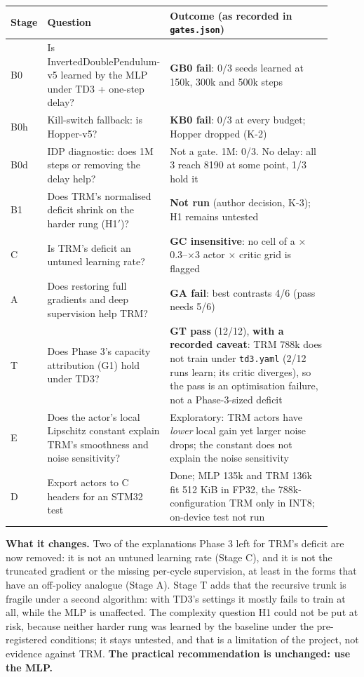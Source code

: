 \documentclass[11pt]{article}
\begin{document}
\begin{center}\small\begin{tabular}{>{\raggedright\arraybackslash}p{0.059\linewidth}>{\raggedright\arraybackslash}p{0.310\linewidth}>{\raggedright\arraybackslash}p{0.538\linewidth}}
\toprule
Stage & Question & Outcome (as recorded in \texttt{gates.json}) \\
\midrule
B0 & Is InvertedDoublePendulum-v5 learned by the MLP under TD3 + one-step delay? & \textbf{GB0 fail}: 0/3 seeds learned at 150k, 300k and 500k steps \\
B0h & Kill-switch fallback: is Hopper-v5? & \textbf{KB0 fail}: 0/3 at every budget; Hopper dropped (K-2) \\
B0d & IDP diagnostic: does 1M steps or removing the delay help? & Not a gate. 1M: 0/3. No delay: all 3 reach 8190 at some point, 1/3 hold it \\
B1 & Does TRM's normalised deficit shrink on the harder rung (H1$'$)? & \textbf{Not run} (author decision, K-3); H1 remains untested \\
C & Is TRM's deficit an untuned learning rate? & \textbf{GC insensitive}: no cell of a $\times$0.3--$\times$3 actor $\times$ critic grid is flagged \\
A & Does restoring full gradients and deep supervision help TRM? & \textbf{GA fail}: best contrasts 4/6 (pass needs 5/6) \\
T & Does Phase 3's capacity attribution (G1) hold under TD3? & \textbf{GT pass} (12/12), \textbf{with a recorded caveat}: TRM 788k does not train under \texttt{td3.yaml} (2/12 runs learn; its critic diverges), so the pass is an optimisation failure, not a Phase-3-sized deficit \\
E & Does the actor's local Lipschitz constant explain TRM's smoothness and noise sensitivity? & Exploratory: TRM actors have \emph{lower} local gain yet larger noise drops; the constant does not explain the noise sensitivity \\
D & Export actors to C headers for an STM32 test & Done; MLP 135k and TRM 136k fit 512 KiB in FP32, the 788k-configuration TRM only in INT8; on-device test not run \\
\bottomrule
\end{tabular}\end{center}



\textbf{What it changes.} Two of the explanations Phase 3 left for TRM's deficit are now removed: it is not an untuned learning rate (Stage C), and it is not the truncated gradient or the missing per-cycle supervision, at least in the forms that have an off-policy analogue (Stage A). Stage T adds that the recursive trunk is fragile under a second algorithm: with TD3's settings it mostly fails to train at all, while the MLP is unaffected. The complexity question H1 could not be put at risk, because neither harder rung was learned by the baseline under the pre-registered conditions; it stays untested, and that is a limitation of the project, not evidence against TRM. \textbf{The practical recommendation is unchanged: use the MLP.}
\end{document}
